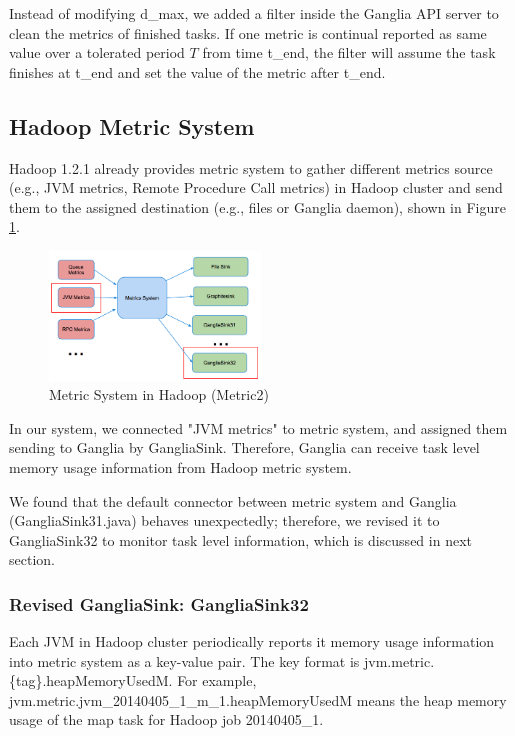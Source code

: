 Instead of modifying d\_max, we added a filter inside the Ganglia API server to clean the metrics of finished tasks. If one metric is continual reported as same value over a tolerated period $T$ from time t\_end, the filter will assume the task finishes at t\_end and set the value of the metric after t\_end. 

\subsection{Hadoop Metric System}

Hadoop 1.2.1 already provides metric system to gather different metrics source (e.g., JVM metrics, Remote Procedure Call metrics) in Hadoop cluster and send them to the assigned destination (e.g., files or Ganglia daemon), shown in Figure \ref{fig:metric2}.

\begin{figure}[h!]
  \centering
    \includegraphics[width=0.5\textwidth]{image/ganglia32}
  \caption{Metric System in Hadoop (Metric2)}
  \label{fig:metric2}
\end{figure}

In our system, we connected "JVM metrics" to metric system, and assigned them sending to Ganglia by GangliaSink. Therefore, Ganglia can receive task level memory usage information from Hadoop metric system.

We found that the default connector between metric system and Ganglia (GangliaSink31.java) behaves unexpectedly; therefore, we revised it to GangliaSink32 to monitor task level information, which is discussed in next section.

\subsubsection{Revised GangliaSink: GangliaSink32}

Each JVM in Hadoop cluster periodically reports it memory usage information into metric system as a key-value pair. The key format is jvm.metric.\{tag\}.heapMemoryUsedM. For example, jvm.metric.jvm\_20140405\_1\_m\_1.heapMemoryUsedM means the heap memory usage of the map task for Hadoop job 20140405\_1. 

